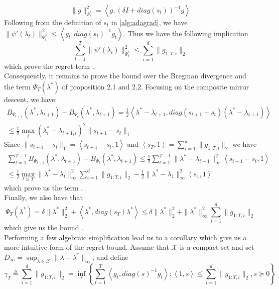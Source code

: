 \documentclass[notitlepage]{article}
\newcommand*\circled[1]{\tikz[baseline=(char.base)]{\node[shape=circle,draw,inner sep=2pt] (char) {#1};}}
\begin{document}
\[ \| g \|_{\Psi_t^*}^2 = \left\langle g,(\delta I + diag(s_t))^{-1} g \right\rangle\]
Following from the definition of $s_t$ in \ref{alg:adagrad}, we have $\|\psi'(\lambda_t)\|_{\Psi_t^*}^2 \le \left\langle g_t, diag(s_t)^{-1} g_t \right\rangle$. Thus we have the following implication
\[ \sum_{t=1}^T \|\psi'(\lambda_t)\|_{\Psi_t^*}^2 \le \sum_{i=1}^d \|g_{1:T,i}\|_2 \]
which prove the regret term \circled{2}.\\
Consequently, it remains to prove the bound over the Bregman divergence and the term $\Psi_T(\lambda^*)$ of proposition 2.1 and 2.2. Focusing on the composite mirror descent, we have:
\begin{align*}
  B_{\Psi_{t+1}} (\lambda^*, \lambda_{t+1}) - B_{\Psi_{t}} (\lambda^*, \lambda_{t+1}) = \frac{1}{2} \left\langle \lambda^* - \lambda_{t+1}, diag(s_{t+1} - s_t)(\lambda^* - \lambda_{t+1}) \right\rangle \\
  \le \frac{1}{2} \max_i (\lambda_i^* - \lambda_{t+1,i})^2 \| s_{t+1} - s_t \|_1
\end{align*}
Since $\| s_{t+1} - s_t \|_1 = \left\langle s_{t+1} - s_t, 1 \right\rangle$ and $\left\langle s_T,1 \right\rangle = \sum_{i=1}^d \| g_{1:T,i} \|_2$ we have
\begin{align*}
  \sum_{t=1}^{T-1} B_{\Psi_{t+1}} (\lambda^*, \lambda_{t+1}) - B_{\Psi_{t}} (\lambda^*, \lambda_{t+1}) \le \frac{1}{2} \sum_{t=1}^{T-1} \| \lambda^* - \lambda_{t+1} \|_\infty^2 \left\langle s_{t+1} - s_t, 1 \right\rangle \\
  \le \frac{1}{2} \max_{t \le T} \|\lambda^* - \lambda_t\|_\infty^2 \sum_{i=1}^d \|g_{1:T,i}\|_2 - \frac{1}{2} \|\lambda^* - \lambda_1\|_\infty^2 \left\langle s_1,1 \right\rangle
\end{align*} 
which prove us the term \circled{3}.\\
Finally, we also have that
\[ \Psi_T(\lambda^*) = \delta \|\lambda^*\|_2^2 + \left\langle \lambda^*, diag(s_T) \lambda^* \right\rangle \le \delta \|\lambda^*\|_2^2 + \|\lambda^*\|_\infty^2 \sum_{i=1}^d \|g_{1:T,i}\|_2 \]
which give us the bound \circled{1}.\\
Performing a few algebraic simplification lead us to a corollary which give us a more intuitive form of the regret bound. Assume that $\mathcal{X}$ is a compact set and set $D_\infty = \sup_{\lambda \in \mathcal{X}} \| \lambda - \lambda^* \|_\infty$, and define
\[ \gamma_T \triangleq \sum_{i=1}^d \| g_{1:T,i} \|_2 = \inf_s \left\lbrace \sum_{t=1}^T \left\langle g_t,diag(s)^{-1} g_t \right\rangle : \left\langle 1,s \right\rangle \le \sum_{i=1}^d \| g_{1:T,i} \|_2, s \succeq 0 \right\rbrace \]
\end{document}
